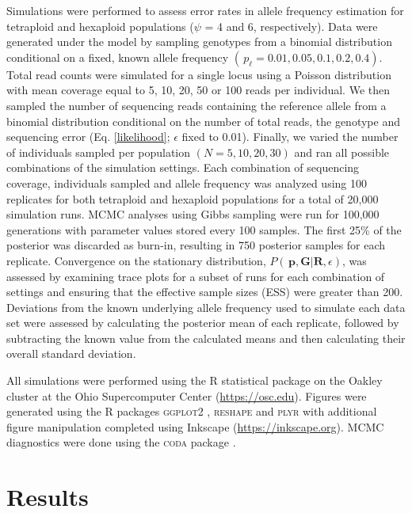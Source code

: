 \documentclass[11pt,english,letterpaper,oneside]{article}
\begin{document}
Simulations were performed to assess error rates in allele frequency estimation for tetraploid and hexaploid populations ($\psi$ = 4 and 6, respectively). Data were generated under the model by sampling genotypes from a binomial distribution conditional on a fixed, known allele frequency $(\,p_{\ell} = 0.01, 0.05, 0.1, 0.2, 0.4)$. Total read counts were simulated for a single locus using a Poisson distribution with mean coverage equal to 5, 10, 20, 50 or 100 reads per individual. We then sampled the number of sequencing reads containing the reference allele from a binomial distribution conditional on the number of total reads, the genotype and sequencing error (Eq. \ref{likelihood}; $\epsilon$ fixed to 0.01). Finally, we varied the number of individuals sampled per population $(N = 5, 10, 20, 30)$ and ran all possible combinations of the simulation settings. Each combination of sequencing coverage, individuals sampled and allele frequency was analyzed using 100 replicates for both tetraploid and hexaploid populations for a total of  20,000 simulation runs. MCMC analyses using Gibbs sampling were run for 100,000 generations with parameter values stored every 100 samples. The first 25\% of the posterior was discarded as burn-in, resulting in 750 posterior samples for each replicate. Convergence on the stationary distribution, $P(\,\bm{p},\bm{G}|\bm{R},\epsilon)$, was assessed by examining trace plots for a subset of runs for each combination of settings and ensuring that the effective sample sizes (ESS) were greater than 200. Deviations from the known underlying allele frequency used to simulate each data set were assessed by calculating the posterior mean of each replicate, followed by subtracting the known value from the calculated means and then calculating their overall standard deviation.
\medskip

All simulations were performed using the R statistical package \citep{r2014} on the Oakley cluster at the Ohio Supercomputer Center (\url{https://osc.edu}). Figures were generated using the R packages \textsc{ggplot2} \citep{wickham2009ggplot2}, \textsc{reshape} \citep{wickham2011plyr} and \textsc{plyr} \citep{wickham2007reshape} with additional figure manipulation completed using Inkscape (\url{https://inkscape.org}). MCMC diagnostics were done using the \textsc{coda} package \citep{plummer2006coda}.
\medskip

\section*{Results}         %
\end{document}
